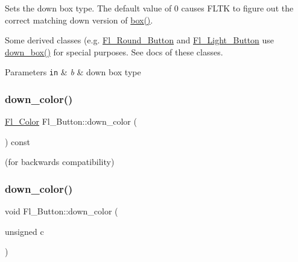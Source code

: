 Sets the down box type. The default value of 0 causes F\+L\+TK to figure out the correct matching down version of \hyperlink{class_fl___widget_a9d1f48fbbe4d885e81df38b2a93b614f}{box()}.

Some derived classes (e.\+g. \hyperlink{class_fl___round___button}{Fl\+\_\+\+Round\+\_\+\+Button} and \hyperlink{class_fl___light___button}{Fl\+\_\+\+Light\+\_\+\+Button} use \hyperlink{class_fl___button_ae5e15aced7a8dba0435f0751d0a2ce37}{down\+\_\+box()} for special purposes. See docs of these classes.


\begin{DoxyParams}[1]{Parameters}
\mbox{\tt in}  & {\em b} & down box type \\
\hline
\end{DoxyParams}
\mbox{\label{class_fl___button_a63b6b9d5b0d44e230f0c8674c8c3f7aa}} 
\subsubsection{\texorpdfstring{down\+\_\+color()}{down\_color()}\hspace{0.1cm}{\footnotesize\ttfamily [1/2]}}
{\footnotesize\ttfamily \hyperlink{_enumerations_8_h_a8b762953646f8abee866061f1af78a6a}{Fl\+\_\+\+Color} Fl\+\_\+\+Button\+::down\+\_\+color (\begin{DoxyParamCaption}{ }\end{DoxyParamCaption}) const\hspace{0.3cm}{\ttfamily [inline]}}



(for backwards compatibility) 

\mbox{\label{class_fl___button_aefa18a3cb511ca9ab8b38a0ae20084b4}} 
\subsubsection{\texorpdfstring{down\+\_\+color()}{down\_color()}\hspace{0.1cm}{\footnotesize\ttfamily [2/2]}}
{\footnotesize\ttfamily void Fl\+\_\+\+Button\+::down\+\_\+color (\begin{DoxyParamCaption}\item[{unsigned}]{c }\end{DoxyParamCaption})\hspace{0.3cm}{\ttfamily [inline]}}



